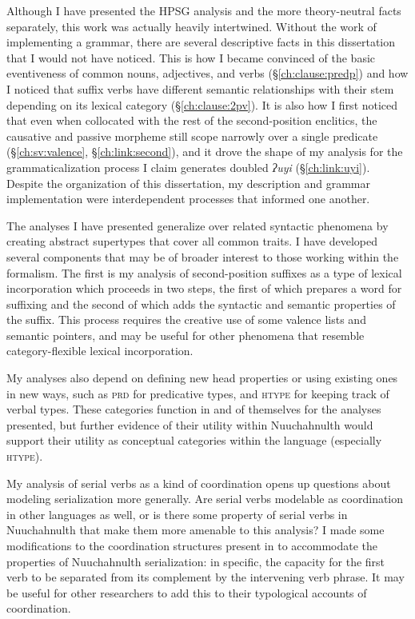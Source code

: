 Although I have presented the HPSG analysis and the more theory-neutral facts separately, this work was actually heavily intertwined. Without the work of implementing a grammar, there are several descriptive facts in this dissertation that I would not have noticed. This is how I became convinced of the basic eventiveness of common nouns, adjectives, and verbs (\S\ref{ch:clause:predp}) and how I noticed that suffix verbs have different semantic relationships with their stem depending on its lexical category (\S\ref{ch:clause:2pv}). It is also how I first noticed that even when collocated with the rest of the second-position enclitics, the causative and passive morpheme still scope narrowly over a single predicate (\S\ref{ch:sv:valence}, \S\ref{ch:link:second}), and it drove the shape of my analysis for the grammaticalization process I claim generates doubled \textit{ʔuyi} (\S\ref{ch:link:uyi}). Despite the organization of this dissertation, my description and grammar implementation were interdependent processes that informed one another.

The analyses I have presented generalize over related syntactic phenomena by creating abstract supertypes that cover all common traits. I have developed several components that may be of broader interest to those working within the formalism. The first is my analysis of second-position suffixes as a type of lexical incorporation which proceeds in two steps, the first of which prepares a word for suffixing and the second of which adds the syntactic and semantic properties of the suffix. This process requires the creative use of some valence lists and semantic pointers, and may be useful for other phenomena that resemble category-flexible lexical incorporation.%

My analyses also depend on defining new head properties or using existing ones in new ways, such as \textsc{prd} for predicative types, and \textsc{htype} for keeping track of verbal types. These categories function in and of themselves for the analyses presented, but further evidence of their utility within Nuuchahnulth would support their utility as conceptual categories within the language (especially \textsc{htype}).

My analysis of serial verbs as a kind of coordination opens up questions about modeling serialization more generally. Are serial verbs modelable as coordination in other languages as well, or is there some property of serial verbs in Nuuchahnulth that make them more amenable to this analysis? I made some modifications to the coordination structures present in \citet{drellishakbender2005} to accommodate the properties of Nuuchahnulth serialization: in specific, the capacity for the first verb to be separated from its complement by the intervening verb phrase. It may be useful for other researchers to add this to their typological accounts of coordination.

